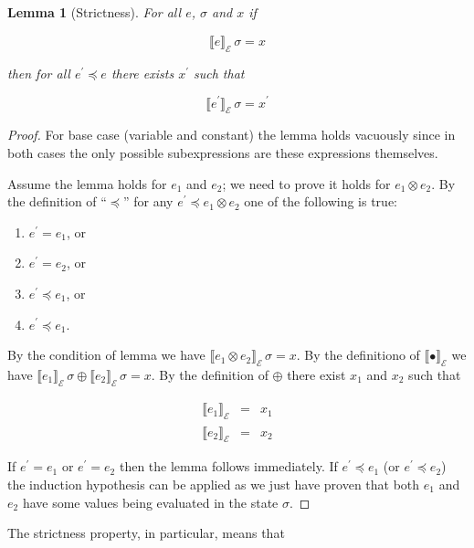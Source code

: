 \documentclass{article}
\newcommand{\sembr}[1]{\llbracket{#1}\rrbracket}
\newcommand{\ph}{{\phantom{x}}}
\newtheorem*{lemma}{Lemma}
\begin{document}
\begin{lemma}[Strictness]
  For all $e$, $\sigma$ and $x$ if

  \[
  \sembr{e}^\ph_\mathscr{E}\,\sigma=x
  \]

  then for all $e^\prime\preceq e$ there exists $x^\prime$ such that

  \[
  \sembr{e^\prime}^\ph_\mathscr{E}\,\sigma=x^\prime
  \]
\end{lemma}
\begin{proof}
  For base case (variable and constant) the lemma holds vacuously since in both cases
  the only possible subexpressions are these expressions themselves.

  Assume the lemma holds for $e_1$ and $e_2$; we need to prove it holds for $e_1\otimes e_2$.
  By the definition of ``$\preceq$'' for any $e^\prime\preceq e_1\otimes e_2$ one of the
  following is true:

  \begin{enumerate}
  \item $e^\prime=e_1$, or
  \item $e^\prime=e_2$, or
  \item $e^\prime\preceq e_1$, or
  \item $e^\prime\preceq e_1$.
  \end{enumerate}

  By the condition of lemma we have $\sembr{e_1\otimes e_2}^\ph_\mathscr{E}\,\sigma=x$.
  By the definitiono of $\sembr{\bullet}^\ph_\mathscr{E}$ we have $\sembr{e_1}^\ph_\mathscr{E}\,\sigma\oplus\sembr{e_2}^\ph_\mathscr{E}\,\sigma=x$.
  By the definition of $\oplus$ there exist $x_1$ and $x_2$ such that

  \[
  \begin{array}{rcl}
    \sembr{e_1}^\ph_\mathscr{E}&=&x_1\\
    \sembr{e_2}^\ph_\mathscr{E}&=&x_2
  \end{array}
  \]

  If $e^\prime=e_1$ or $e^\prime=e_2$ then the lemma follows immediately.
  If $e^\prime\preceq e_1$ (or $e^\prime\preceq e_2$) the induction hypothesis can be applied as we just have proven that
  both $e_1$ and $e_2$ have some values being evaluated in the state $\sigma$.
\end{proof}

The strictness property, in particular, means that 
\end{document}
